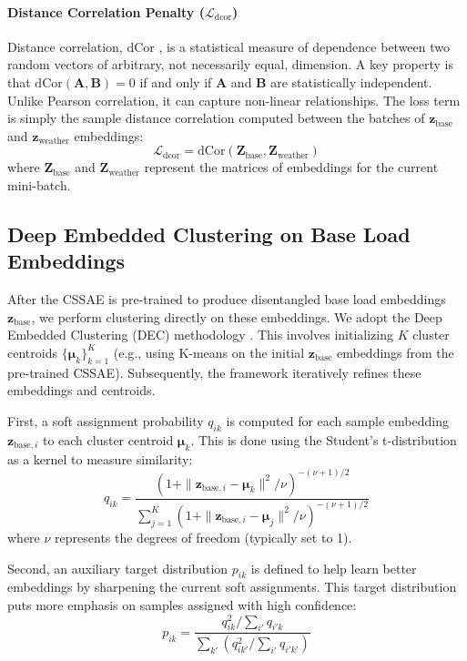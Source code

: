 \documentclass[journal]{IEEEtran}
\begin{document}
\paragraph{Distance Correlation Penalty ($\mathcal{L}_{\text{dcor}}$)}
Distance correlation, dCor \cite{szekely2007measuring}, is a statistical measure of dependence between two random vectors of arbitrary, not necessarily equal, dimension. A key property is that $\text{dCor}(\mathbf{A}, \mathbf{B}) = 0$ if and only if $\mathbf{A}$ and $\mathbf{B}$ are statistically independent. Unlike Pearson correlation, it can capture non-linear relationships. The loss term is simply the sample distance correlation computed between the batches of $\mathbf{z}_{\text{base}}$ and $\mathbf{z}_{\text{weather}}$ embeddings:
\begin{equation}
\mathcal{L}_{\text{dcor}} = \text{dCor}(\mathbf{Z}_{\text{base}}, \mathbf{Z}_{\text{weather}})
\end{equation}
where $\mathbf{Z}_{\text{base}}$ and $\mathbf{Z}_{\text{weather}}$ represent the matrices of embeddings for the current mini-batch.

\subsection{Deep Embedded Clustering on Base Load Embeddings}
After the CSSAE is pre-trained to produce disentangled base load embeddings $\mathbf{z}_{\text{base}}$, we perform clustering directly on these embeddings. We adopt the Deep Embedded Clustering (DEC) methodology \cite{deep_embedding_clustering_xie}. This involves initializing $K$ cluster centroids $\{\boldsymbol{\mu}_k\}_{k=1}^K$ (e.g., using K-means on the initial $\mathbf{z}_{\text{base}}$ embeddings from the pre-trained CSSAE). Subsequently, the framework iteratively refines these embeddings and centroids.

First, a soft assignment probability $q_{ik}$ is computed for each sample embedding $\mathbf{z}_{\text{base},i}$ to each cluster centroid $\boldsymbol{\mu}_k$. This is done using the Student's t-distribution as a kernel to measure similarity:
\begin{equation}
q_{ik} = \frac{(1 + \|\mathbf{z}_{\text{base},i} - \boldsymbol{\mu}_k\|^2 / \nu)^{-(\nu+1)/2}}{\sum_{j=1}^K (1 + \|\mathbf{z}_{\text{base},i} - \boldsymbol{\mu}_j\|^2 / \nu)^{-(\nu+1)/2}}
\end{equation}
where $\nu$ represents the degrees of freedom (typically set to 1).

Second, an auxiliary target distribution $p_{ik}$ is defined to help learn better embeddings by sharpening the current soft assignments. This target distribution puts more emphasis on samples assigned with high confidence:
\begin{equation}
p_{ik} = \frac{q_{ik}^2 / \sum_{i'} q_{i'k}}{\sum_{k'} (q_{ik'}^2 / \sum_{i'} q_{i'k'})}
\end{equation}
\end{document}
